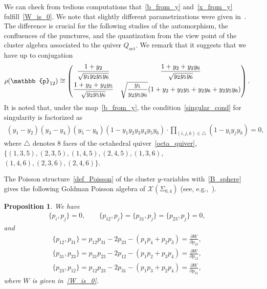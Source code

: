 \documentclass[10pt,a4paper]{amsart}
\numberwithin{equation}{section}
\newtheorem{Proposition}[Theorem]{Proposition}
 { \theoremstyle{definition}
\newtheorem{Definition}[Theorem]{Definition}
\newtheorem{Note}[Theorem]{Note}
\newtheorem{Example}[Theorem]{Example}
\newtheorem{Remark}[Theorem]{Remark} }
\begin{document}
We can check from tedious computations that~\eqref{b_from_y} and~\eqref{x_from_y} fulfill~\eqref{W_is_0}. We note that slightly different parametrizations were given in~\cite{ChekhMazzo10a,ComaGabeTesc15a, GaioMoorNeit13a}.
The difference is crucial for the following studies of the automorphism, the confluences of the punctures, and the quantization from the view point of the cluster algebra associated to the quiver $Q_{\text{oct}}$. We remark that it suggests that we have up to conjugation
\begin{gather*}
 \rho(\mathbb{p}_{12}) \cong
 \begin{pmatrix}
 \dfrac{1+y_2}{ \sqrt{y_1 y_2 y_5 y_6} } & \dfrac{1+y_2 + y_2 y_6}{\sqrt{y_2 y_5 y_6}} \vspace{1mm}\\
 \dfrac{1+y_2 + y_2 y_5}{\sqrt{y_2 y_5 y_6}} & \sqrt{\dfrac{y_1}{y_2 y_5 y_6}}( 1+y_2 + y_2 y_5 + y_2 y_6 + y_2 y_5 y_6)
 \end{pmatrix} .
\end{gather*}
It is noted that, under the map~\eqref{b_from_y}, the condition~\eqref{singular_cond} for singularity is factorized as
\begin{gather*}
(y_1-y_2) ( y_3 - y_4) ( y_5-y_6 ) ( 1-y_1 y_2 y_3 y_4 y_5 y_6 )\cdot \prod_{(i,j,k) \in \triangle} ( 1-y_i y_j y_k ) =0 ,
\end{gather*}
where $\triangle$ denotes $8$ faces of the octahedral quiver~\eqref{octa_quiver}, $\{ (1{,}3{,}5), (2{,}3{,}5), (1{,}4{,}5), (2{,}4{,}5), (1{,}3{,}6)$, $(1,4,6), (2,3,6), (2,4,6)\}$.

The Poisson structure~\eqref{def_Poisson} of the cluster $y$-variables with~\eqref{B_sphere} gives the following Goldman Poisson algebra of $\mathcal{X}(\Sigma_{0,4})$ (see, e.g.,~\cite{ChekhMazzo10a,ChekMazzRubt15a,NekrRoslShat11a}).

\begin{Proposition} \label{prop:Poisson_x_b} We have
 \begin{gather} \label{b_b_Poisson}
\{ p_i, p_j \} = 0 ,\qquad \{ p_{12} , p_j \} = \{ p_{31} , p_j \} =\{ p_{23} , p_j\} = 0 ,
 \end{gather}
 and
 \begin{gather}
\{ p_{12}, p_{31} \} = p_{12} p_{31} - 2 p_{23} - ( p_1 p_4 + p_2 p_3 ) = \frac{\partial W}{\partial p_{23}} ,\nonumber \\
\{ p_{31} , p_{23}\} = p_{31} p_{23} - 2 p_{12} - ( p_1 p_2 + p_3 p_4 ) = \frac{\partial W}{\partial p_{12}} ,\nonumber \\
\{ p_{23} , p_{12} \} = p_{12} p_{23} - 2 p_{31} - ( p_1 p_3 + p_2 p_4 ) = \frac{\partial W}{\partial p_{31}} , \label{x_x_Poisson}
 \end{gather}
 where $W$ is given in~\eqref{W_is_0}.
\end{Proposition}
\end{document}
